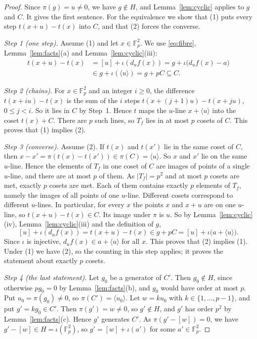 \documentclass[11pt]{amsart}
\theoremstyle{definition}\newtheorem{definition}[theorem]{Definition}
\theoremstyle{remark}\newtheorem{remark}[theorem]{Remark}
\newcommand{\F}{\mathbb{F}}
\newcommand{\abs}[1]{\lvert #1\rvert}
\newcommand{\gen}[1]{\langle #1\rangle}
\begin{document}
\begin{proof}
Since \(\pi(g)=u\ne0\), we have \(g\notin H\), and Lemma~\ref{lem:cyclic} applies to \(g\) and \(C\).
It gives the first sentence.
For the equivalence we show that (1) puts every step \(t(x+u)-t(x)\) into \(C\), and that (2) forces the converse.

\emph{Step 1 (one step).}
Assume (1) and let \(x\in\F_p^2\).
We use \eqref{eq:fibre}, Lemma~\ref{lem:facts}(a) and Lemma~\ref{lem:cyclic}(iii):
\begin{align*}
t(x+u)-t(x)&=[u]+\iota(d_uf(x))=g+\iota\bigl(d_uf(x)-a\bigr)\\
&\in g+\iota(\gen{u})=g+pC\subseteq C .
\end{align*}

\emph{Step 2 (chains).}
For \(x\in\F_p^2\) and an integer \(i\ge0\), the difference \(t(x+iu)-t(x)\) is the sum of the \(i\) steps \(t(x+(j+1)u)-t(x+ju)\), \(0\le j<i\).
So it lies in \(C\) by Step~1.
Hence \(t\) maps the \(u\)-line \(x+\gen{u}\) into the coset \(t(x)+C\).
There are \(p\) such lines, so \(T_f\) lies in at most \(p\) cosets of \(C\).
This proves that (1) implies (2).

\emph{Step 3 (converse).}
Assume (2).
If \(t(x)\) and \(t(x')\) lie in the same coset of \(C\), then \(x-x'=\pi(t(x)-t(x'))\in\pi(C)=\gen{u}\).
So \(x\) and \(x'\) lie on the same \(u\)-line.
Hence the elements of \(T_f\) in one coset of \(C\) are images of points of a single \(u\)-line, and there are at most \(p\) of them.
As \(\abs{T_f}=p^2\) and at most \(p\) cosets are met, exactly \(p\) cosets are met.
Each of them contains exactly \(p\) elements of \(T_f\), namely the images of all points of one \(u\)-line.
Different cosets correspond to different \(u\)-lines.
In particular, for every \(x\) the points \(x\) and \(x+u\) are on one \(u\)-line, so \(t(x+u)-t(x)\in C\).
Its image under \(\pi\) is \(u\).
So by Lemma~\ref{lem:cyclic}(iv), Lemma~\ref{lem:cyclic}(iii) and the definition of \(g\),
\[
[u]+\iota(d_uf(x))=t(x+u)-t(x)\in g+pC=[u]+\iota\bigl(a+\gen{u}\bigr).
\]
Since \(\iota\) is injective, \(d_uf(x)\in a+\gen{u}\) for all \(x\).
This proves that (2) implies (1).
Under (1) we have (2), so the counting in this step applies; it proves the statement about exactly \(p\) cosets.

\emph{Step 4 (the last statement).}
Let \(g_0\) be a generator of \(C'\).
Then \(g_0\notin H\), since otherwise \(pg_0=0\) by Lemma~\ref{lem:facts}(b), and \(g_0\) would have order at most \(p\).
Put \(u_0=\pi(g_0)\ne0\), so \(\pi(C')=\gen{u_0}\).
Let \(w=ku_0\) with \(k\in\{1,\dots,p-1\}\), and put \(g'=kg_0\in C'\).
Then \(\pi(g')=w\ne0\), so \(g'\notin H\), and \(g'\) has order \(p^2\) by Lemma~\ref{lem:facts}(c).
Hence \(g'\) generates \(C'\).
As \(\pi(g'-[w])=0\), we have \(g'-[w]\in H=\iota(\F_p^2)\), so \(g'=[w]+\iota(a')\) for some \(a'\in\F_p^2\).
\end{proof}
\end{document}
